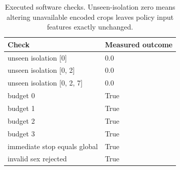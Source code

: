 \begin{table}[!t]
\centering\footnotesize
\caption{Executed software checks. Unseen-isolation zero means altering unavailable encoded crops leaves policy input features exactly unchanged.}
\label{tab:prelim_checks}
\begin{tabularx}{\columnwidth}{@{}p{27mm}X@{}}
\toprule
Check & Measured outcome \\
\midrule
unseen isolation [0] & 0.0 \\
unseen isolation [0, 2] & 0.0 \\
unseen isolation [0, 2, 7] & 0.0 \\
budget 0 & True \\
budget 1 & True \\
budget 2 & True \\
budget 3 & True \\
immediate stop equals global & True \\
invalid sex rejected & True \\
\bottomrule
\end{tabularx}
\end{table}